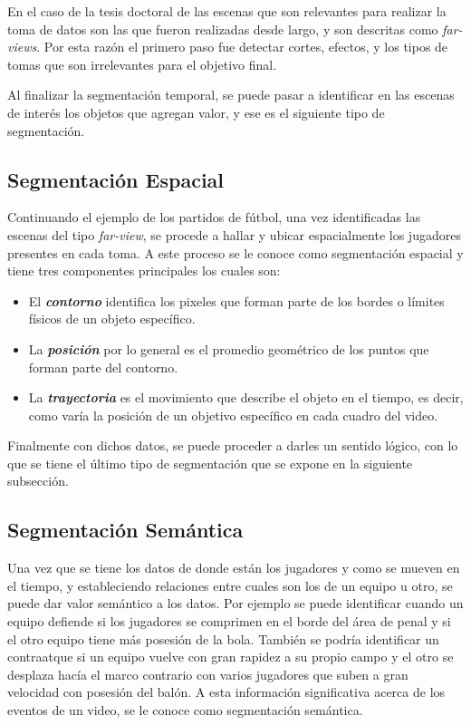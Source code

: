 En el caso de la tesis doctoral de \cite{siles1} las escenas que son relevantes para realizar la toma de datos son las que fueron realizadas desde largo, y son descritas como \emph{far-views}. Por esta razón el primero paso fue detectar cortes, efectos, y los tipos de tomas que son irrelevantes para el objetivo final.

Al finalizar la segmentación temporal, se puede pasar a identificar en las escenas de interés los objetos que agregan valor, y ese es el siguiente tipo de segmentación. 

\subsection{Segmentación Espacial}

Continuando el ejemplo de los partidos de fútbol, una vez identificadas las escenas del tipo \emph{far-view}, se procede a hallar y ubicar espacialmente los jugadores presentes en cada toma. A este proceso se le conoce como segmentación espacial y tiene tres componentes principales los cuales son:

\begin{itemize}
	\item El \emph{\textbf{contorno}} identifica los pixeles que forman parte de los bordes o límites físicos de un objeto específico.
	\item La \emph{\textbf{posición}} por lo general es el promedio geométrico de los puntos que forman parte del contorno.
	\item La \emph{\textbf{trayectoria}} es el movimiento que describe el objeto en el tiempo, es decir, como varía la posición de un objetivo específico en cada cuadro del video.
\end{itemize}

Finalmente con dichos datos, se puede proceder a darles un sentido lógico, con lo que se tiene el último tipo de segmentación que se expone en la siguiente subsección.

\subsection{Segmentación Semántica}

Una vez que se tiene los datos de donde están los jugadores y como se mueven en el tiempo, y estableciendo relaciones entre cuales son los de un equipo u otro, se puede dar valor semántico a los datos. Por ejemplo se puede identificar cuando un equipo defiende si los jugadores se comprimen en el borde del área de penal y si el otro equipo tiene más posesión de la bola. También se podría identificar un contraatque si un equipo vuelve con gran rapidez a su propio campo y el otro se desplaza hacía el marco contrario con varios jugadores que suben a gran velocidad con posesión del balón. A esta información significativa acerca de los eventos de un video, se le conoce como segmentación semántica.



